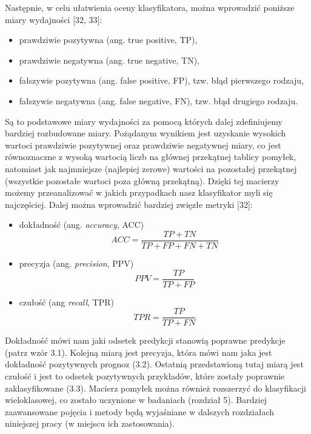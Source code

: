 \noindent Następnie, w celu ułatwienia oceny klasyfikatora, można wprowadzić poniższe miary wydajności [32, 33]:
\begin{itemize}
\item
prawdziwie pozytywna (ang. true positive, TP),

\item
prawdziwie negatywna (ang. true negative, TN),

\item
fałszywie pozytywna (ang. false positive, FP), tzw. błąd pierwszego rodzaju,

\item
fałszywie negatywna (ang. false negative, FN), tzw. błąd drugiego rodzaju.
\end{itemize}
\noindent Są to podstawowe miary wydajności za pomocą których dalej zdefiniujemy bardziej rozbudowane miary. Pożądanym wynikiem jest uzyskanie wysokich wartoci prawdziwie pozytywnej oraz prawdziwie negatywnej miary, co jest równoznaczne z wysoką wartocią liczb na głównej przekątnej tablicy pomyłek, natomiast jak najmniejsze (najlepiej zerowe) wartości na pozostałej przekątnej (wszystkie pozostałe wartoci poza główną przekątną). Dzięki tej macierzy możemy przeanalizować w jakich przypadkach nasz klasyfikator myli się najczęściej. Dalej można wprowadzić bardziej zwięzłe metryki [32]:
\begin{itemize}

\item
dokładność (ang. \textit{accuracy}, ACC)
\begin{equation}
ACC=\frac {TP+TN} {TP+FP+FN+TN}
\end{equation}

\item
precyzja (ang. \textit{precision}, PPV)
\begin{equation}
PPV=\frac {TP} {TP+FP}
\end{equation}

\item
czułość (ang \textit{recall}, TPR)
\begin{equation}
TPR=\frac {TP} {TP+FN}
\end{equation}
\end{itemize}

\noindent Dokładność mówi nam jaki odsetek predykcji stanowią poprawne predykcje (patrz wzór 3.1). Kolejną miarą jest precyzja, która mówi nam jaka jest dokładność pozytywnych prognoz (3.2). Ostatnią przedstawioną tutaj miarą jest czułość i jest to odsetek pozytywnych przykładów, które zostały poprawnie zaklasyfikowane (3.3). Macierz pomyłek można również rozszerzyć do klasyfikacji wieloklasowej, co zostało uczynione w badaniach (rozdział 5). Bardziej zaawansowane pojęcia i metody będą wyjaśniane w dalszych rozdziałach niniejszej pracy (w miejscu ich zastosowania).

